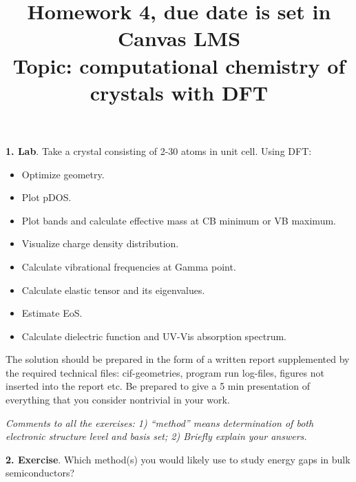 \documentclass{homework}
\begin{document}
\title{Homework 4, due date is set in Canvas LMS\\ Topic: computational chemistry of crystals with DFT}
\maketitle

\textbf{1. Lab}. Take a crystal consisting of 2-30 atoms in unit cell. Using DFT:
\begin{itemize}\setlength{\itemsep}{0ex}
\item Optimize geometry.
\item Plot pDOS.
\item Plot bands and calculate effective mass at CB minimum or VB maximum.
\item Visualize charge density distribution.
\item Calculate vibrational frequencies at Gamma point.
\item Calculate elastic tensor and its eigenvalues.
\item Estimate EoS.
\item Calculate dielectric function and UV-Vis absorption spectrum.  
\end{itemize}
The solution should be prepared in the form of a written report supplemented by the required technical files: cif-geometries, program run log-files, figures not inserted into the report etc. Be prepared to give a 5 min presentation of everything that you consider nontrivial in your work.

\bigskip\bigskip

\textit{Comments to all the exercises: 1) ``method'' means determination of both electronic structure level and basis set; 2) Briefly explain your answers.}

\bigskip

\textbf{2. Exercise}. Which method(s) you would likely use to study energy gaps in bulk semiconductors?

\bigskip
\end{document}
